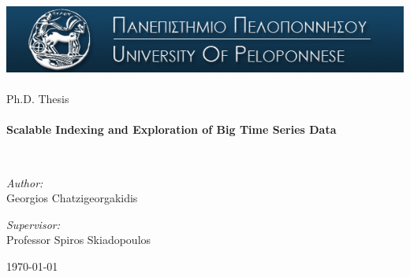 \begin{titlepage}
\begin{center}


\includegraphics[width=1\textwidth]{logo}~\\[1cm]


\Large Ph.D. Thesis\\[0.5cm]

\HRule \\[0.4cm]
{ \huge \bfseries Scalable Indexing and Exploration of Big Time Series Data\\[0.4cm] }

\HRule \\[1.5cm]

\begin{minipage}{0.375\textwidth}
\begin{flushleft} \large
\textit{Author:} \\
Georgios Chatzigeorgakidis
\end{flushleft}
\end{minipage}
\begin{minipage}{0.6\textwidth}
\begin{flushright} \large
\textit{Supervisor:} \\
Professor Spiros Skiadopoulos
\end{flushright}
\end{minipage}

\vfill

{\large \today}


\end{center}
\end{titlepage}
